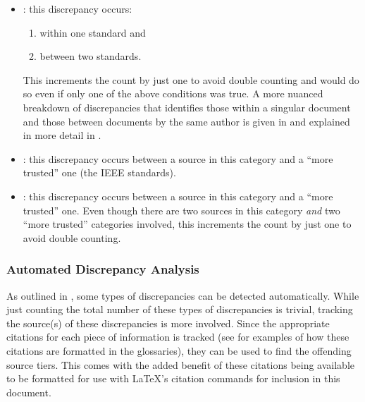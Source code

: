 \begin{itemize}
    \item \textbf{\stds{}}: this discrepancy occurs:
          \begin{enumerate}
              \item within one standard and
              \item between two standards.
          \end{enumerate}
          This increments the count by just one to avoid double counting and
          would do so even if only one of the above conditions was true. A more
          nuanced breakdown of discrepancies that identifies those within a
          singular document and those between documents by the same author is
          given in  and explained in more detail in
          .
    \item \textbf{\metas{}}: this discrepancy occurs between a
          source in this category and a ``more trusted'' one
          (the IEEE standards).
    \item \textbf{\papers{}}: this discrepancy occurs between a
          source in this category and a ``more trusted'' one. Even though there
          are two sources in this category \emph{and} two ``more trusted''
          categories involved, this increments the count by just one to avoid
          double counting.
\end{itemize}

\subsubsection{Automated Discrepancy Analysis}
\label{auto-discrep-analysis}

As outlined in , some types of discrepancies can be detected
automatically. While just counting the total number of these types of
discrepancies is trivial, tracking the source(s) of these discrepancies is more
involved. Since the appropriate citations for each piece of information is
tracked (see  for examples of
how these citations are formatted in the glossaries), they can be used to find
the offending source tiers. This comes with the added benefit of these
citations being available to be formatted for use with \LaTeX{}'s citation
commands for inclusion in this document.

